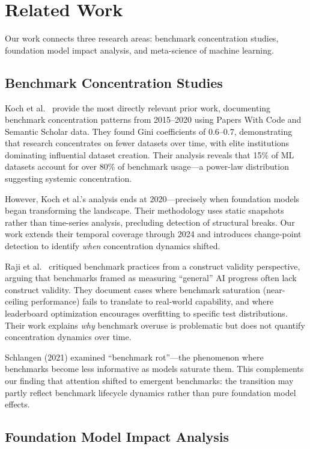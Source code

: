 \section{Related Work}

Our work connects three research areas: benchmark concentration studies, foundation model impact analysis, and meta-science of machine learning.

\subsection{Benchmark Concentration Studies}

Koch et al.~\cite{koch2021reduced} provide the most directly relevant prior work, documenting benchmark concentration patterns from 2015--2020 using Papers With Code and Semantic Scholar data. They found Gini coefficients of 0.6--0.7, demonstrating that research concentrates on fewer datasets over time, with elite institutions dominating influential dataset creation. Their analysis reveals that 15\% of ML datasets account for over 80\% of benchmark usage---a power-law distribution suggesting systemic concentration.

However, Koch et al.'s analysis ends at 2020---precisely when foundation models began transforming the landscape. Their methodology uses static snapshots rather than time-series analysis, precluding detection of structural breaks. Our work extends their temporal coverage through 2024 and introduces change-point detection to identify \emph{when} concentration dynamics shifted.

Raji et al.~\cite{raji2021ai} critiqued benchmark practices from a construct validity perspective, arguing that benchmarks framed as measuring ``general'' AI progress often lack construct validity. They document cases where benchmark saturation (near-ceiling performance) fails to translate to real-world capability, and where leaderboard optimization encourages overfitting to specific test distributions. Their work explains \emph{why} benchmark overuse is problematic but does not quantify concentration dynamics over time.

Schlangen (2021) examined ``benchmark rot''---the phenomenon where benchmarks become less informative as models saturate them. This complements our finding that attention shifted to emergent benchmarks: the transition may partly reflect benchmark lifecycle dynamics rather than pure foundation model effects.

\subsection{Foundation Model Impact Analysis}

